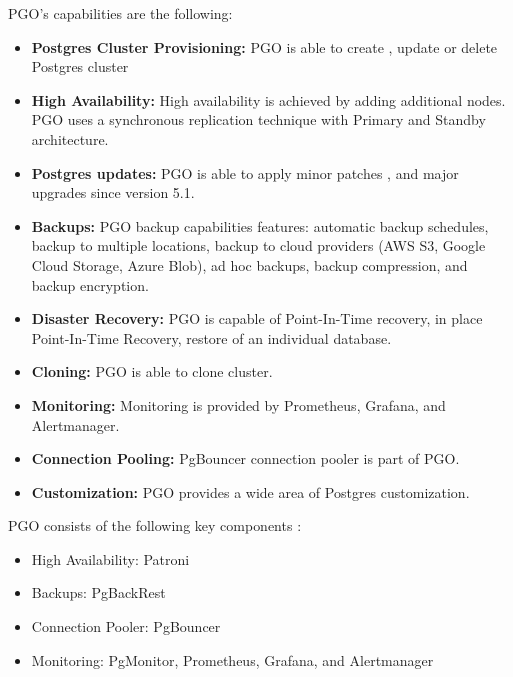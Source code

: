 PGO’s capabilities are the following:
\begin{itemize}
    \item \textbf{Postgres Cluster Provisioning:} PGO is able to create \cite{CrunchyDocCreate}, update \cite{CrunchyDocUpdate} or delete Postgres cluster \cite{CrunchyDocDelete}
    \item \textbf{High Availability:} High availability is achieved by adding additional nodes. PGO uses a synchronous replication technique with Primary and Standby architecture. \cite{CrunchyDocHA}
    \item \textbf{Postgres updates:} PGO is able to apply minor patches \cite{CrunchyDocMinorUpdates}, and major upgrades since version 5.1. \cite{CrunchyBlogUpdates}
    \item \textbf{Backups:} PGO backup capabilities features: automatic backup schedules, backup to multiple locations, backup to cloud providers (AWS S3, Google Cloud Storage, Azure Blob), ad hoc backups, backup compression, and backup encryption. \cite{CrunchyDocBackups}
    \item \textbf{Disaster Recovery:} PGO is capable of Point-In-Time recovery, in place Point-In-Time Recovery, restore of an individual database. \cite{CrunchyDocDisasterRecovery}
    \item \textbf{Cloning:} PGO is able to clone cluster. \cite{CrunchyDocDisasterRecovery}
    \item \textbf{Monitoring:} Monitoring is provided by Prometheus, Grafana, and Alertmanager. \cite{CrunchyDocMonitoring}
    \item \textbf{Connection Pooling:} PgBouncer connection pooler is part of PGO. \cite{CrunchyDocConnectionPooling}
    \item  \textbf{Customization:} PGO provides a wide area of Postgres customization. \cite{CrunchyDocCustomisation}
\end{itemize}


PGO consists of the following key components \cite{CrunchyPGOGit}:
\begin{itemize}
    \item High Availability: Patroni
    \item Backups: PgBackRest
    \item Connection Pooler: PgBouncer
    \item Monitoring: PgMonitor, Prometheus, Grafana, and Alertmanager
\end{itemize}

